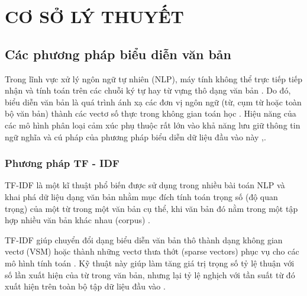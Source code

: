 
\chapter{CƠ SỞ LÝ THUYẾT} %

\label{Chapter2} %


\section{Các phương pháp biểu diễn văn bản}

Trong lĩnh vực xử lý ngôn ngữ tự nhiên (NLP), máy tính không thể trực tiếp tiếp nhận và tính toán trên các chuỗi ký tự hay từ vựng thô dạng văn bản \cite{singh2018natural}. Do đó, biểu diễn văn bản là quá trình ánh xạ các đơn vị ngôn ngữ (từ, cụm từ hoặc toàn bộ văn bản) thành các vectơ số thực trong không gian toán học \cite{singh2018natural}. Hiệu năng của các mô hình phân loại cảm xúc phụ thuộc rất lớn vào khả năng lưu giữ thông tin ngữ nghĩa và cú pháp của phương pháp biểu diễn dữ liệu đầu vào này \cite{singh2018natural},\cite{mikolov2013efficient}.

\subsection{Phương pháp TF - IDF}

TF-IDF là một kĩ thuật phổ biến được sử dụng trong nhiều bài toán NLP và khai phá dữ liệu dạng văn bản nhằm mục đích tính toán trọng số (độ quan trọng) của một từ trong một văn bản cụ thể, khi văn bản đó nằm trong một tập hợp nhiều văn bản khác nhau (corpus) \cite{singh2018natural}.

TF-IDF giúp chuyển đổi dạng biểu diễn văn bản thô thành dạng không gian vectơ (VSM) hoặc thành những vectơ thưa thớt (sparse vectors) phục vụ cho các mô hình tính toán \cite{singh2018natural}. Kỹ thuật này giúp làm tăng giá trị trọng số tỷ lệ thuận với số lần xuất hiện của từ trong văn bản, nhưng lại tỷ lệ nghịch với tần suất từ đó xuất hiện trên toàn bộ tập dữ liệu đầu vào \cite{singh2018natural}. 

